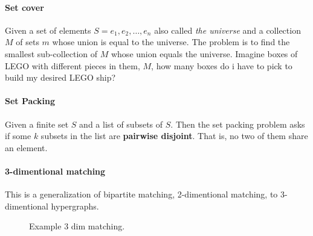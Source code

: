 \documentclass[12pt]{article} %
\begin{document}
\paragraph{Set cover}
Given a set of elements $S = {e_{1}, e_{2}, \dots, e_{n}}$ also called \textit{the universe} and a collection $M$ of sets $m$ whose union is equal to the universe. The problem is to find the smallest sub-collection of $M$ whose union equals the universe. Imagine boxes of LEGO with different pieces in them, $M$, how many boxes do i have to pick to build my desired LEGO ship?

\paragraph{Set Packing}
Given a finite set $S$ and a list of subsets of $S$. Then the set packing problem asks if some $k$ subsets in the list are \textbf{pairwise disjoint}. That is, no two of them share an element. 

\paragraph{3-dimentional matching}
This is a generalization of bipartite matching, 2-dimentional matching, to 3-dimentional hypergraphs.
\begin{figure}[H]
\caption{Example 3 dim matching.}
\label{3dim}
\end{figure} 
\end{document}
